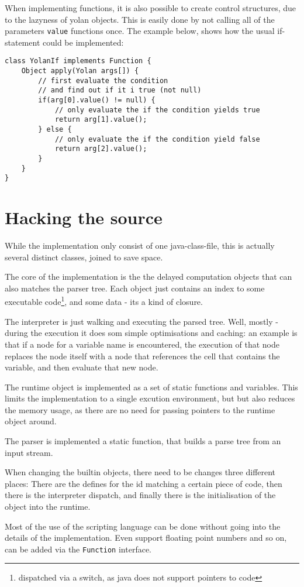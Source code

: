 When implementing functions, it is also possible to create control structures, due to the lazyness of yolan objects. This is easily done by not calling all of the parameters \verb|value| functions once. The example below, shows how the usual if-statement could be implemented:
{\scriptsize 
\begin{verbatim}
class YolanIf implements Function {
    Object apply(Yolan args[]) {
        // first evaluate the condition
        // and find out if it i true (not null)
        if(arg[0].value() != null) {
            // only evaluate the if the condition yields true
            return arg[1].value();
        } else {
            // only evaluate the if the condition yield false
            return arg[2].value();
        }
    }
}
\end{verbatim}
}

\section{Hacking the source}
\label{j2mesource}
While the implementation only consist of one java-class-file, 
this is actually several distinct classes, joined to save space.

The core of the implementation is the the delayed computation objects that can also matches the parser tree. Each object just contains an index to some executable code\footnote{dispatched via a switch, as java does not support pointers to code}, and some data - its a kind of closure. 

The interpreter is just walking and executing the parsed tree. Well, mostly - during the execution it does som simple optimisations and caching: an example is that if a node for a variable name is encountered, the execution of that node replaces the node itself with a node that references the cell that contains the variable, and then evaluate that new node.

The runtime object is implemented as a set of static functions and variables.
This limits the implementation to a single excution environment, but but also reduces the memory usage, as there are no need for passing pointers to the runtime object around.

The parser is implemented a static function, that builds a parse tree from an input stream.

When changing the builtin objects, there need to be changes three different places: There are the defines for the id matching a certain piece of code, then there is the interpreter dispatch, and finally there is the initialisation of the object into the runtime.


Most of the use of the scripting language can be done without going into the details of the implementation. Even support floating point numbers and so on, can be added via the \verb|Function| interface.

